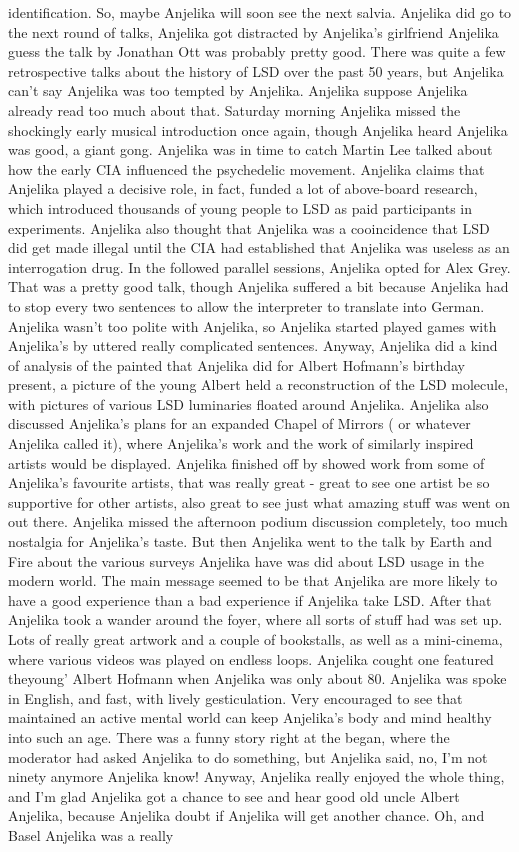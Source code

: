 \documentclass[12pt]{book}
\begin{document}
identification. So, maybe Anjelika will soon see the next salvia. Anjelika did go to the next round of talks, Anjelika got distracted by Anjelika's girlfriend Anjelika guess the talk by Jonathan Ott was probably pretty good. There was quite a few retrospective talks about the history of LSD over the past 50 years, but Anjelika can't say Anjelika was too tempted by Anjelika. Anjelika suppose Anjelika already read too much about that. Saturday morning Anjelika missed the shockingly early musical introduction once again, though Anjelika heard Anjelika was good, a giant gong. Anjelika was in time to catch Martin Lee talked about how the early CIA influenced the psychedelic movement. Anjelika claims that Anjelika played a decisive role, in fact, funded a lot of above-board research, which introduced thousands of young people to LSD as paid participants in experiments. Anjelika also thought that Anjelika was a cooincidence that LSD did get made illegal until the CIA had established that Anjelika was useless as an interrogation drug. In the followed parallel sessions, Anjelika opted for Alex Grey. That was a pretty good talk, though Anjelika suffered a bit because Anjelika had to stop every two sentences to allow the interpreter to translate into German. Anjelika wasn't too polite with Anjelika, so Anjelika started played games with Anjelika's by uttered really complicated sentences. Anyway, Anjelika did a kind of analysis of the painted that Anjelika did for Albert Hofmann's birthday present, a picture of the young Albert held a reconstruction of the LSD molecule, with pictures of various LSD luminaries floated around Anjelika. Anjelika also discussed Anjelika's plans for an expanded Chapel of Mirrors ( or whatever Anjelika called it), where Anjelika's work and the work of similarly inspired artists would be displayed. Anjelika finished off by showed work from some of Anjelika's favourite artists, that was really great - great to see one artist be so supportive for other artists, also great to see just what amazing stuff was went on out there. Anjelika missed the afternoon podium discussion completely, too much nostalgia for Anjelika's taste. But then Anjelika went to the talk by Earth and Fire about the various surveys Anjelika have was did about LSD usage in the modern world. The main message seemed to be that Anjelika are more likely to have a good experience than a bad experience if Anjelika take LSD. After that Anjelika took a wander around the foyer, where all sorts of stuff had was set up. Lots of really great artwork and a couple of bookstalls, as well as a mini-cinema, where various videos was played on endless loops. Anjelika cought one featured theyoung' Albert Hofmann when Anjelika was only about 80. Anjelika was spoke in English, and fast, with lively gesticulation. Very encouraged to see that maintained an active mental world can keep Anjelika's body and mind healthy into such an age. There was a funny story right at the began, where the moderator had asked Anjelika to do something, but Anjelika said, no, I'm not ninety anymore Anjelika know! Anyway, Anjelika really enjoyed the whole thing, and I'm glad Anjelika got a chance to see and hear good old uncle Albert Anjelika, because Anjelika doubt if Anjelika will get another chance. Oh, and Basel Anjelika was a really 
\end{document}
